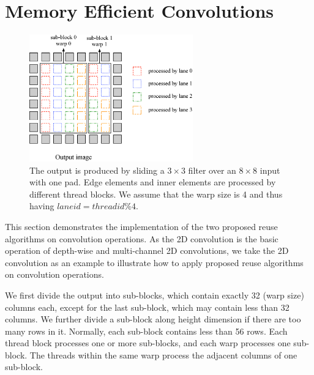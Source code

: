 \section{Memory Efficient Convolutions}
\begin{figure}
	\centering
	\includegraphics[width=0.9\columnwidth,height=5.5cm]{./figure/overalldesign.eps}
\caption{The output is produced by sliding a $3 \times 3$ filter over an $8 \times 8$ input with one pad. Edge elements and inner elements are processed by different thread blocks. We assume that the warp size is 4 and thus having $laneid=threadid\%4$.}
\label{fig:overalldesign}
\end{figure}


This section demonstrates the implementation of the two proposed reuse algorithms on convolution operations. {\color{red}As the 2D convolution is the basic operation of depth-wise and multi-channel 2D convolutions, we take the 2D convolution as an example to illustrate how to apply proposed reuse algorithms on convolution operations.}

We first divide the output into sub-blocks, which contain exactly 32 (warp size) columns each, except for the last sub-block, which may contain less than 32 columns. {\color{red}We further divide a sub-block along height dimension if there are too many rows in it. Normally, each sub-block contains less than 56 rows.}
Each thread block processes one or more sub-blocks, and each warp processes one sub-block. The threads within the same warp process the adjacent columns of one sub-block.

